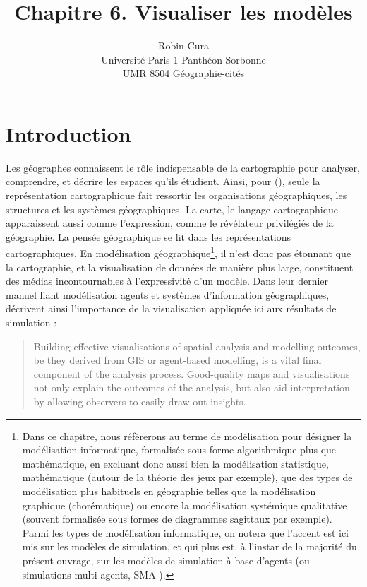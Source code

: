 \documentclass[a4paper, 12pt]{article}
\title{Chapitre 6. Visualiser les modèles}
\author{Robin Cura\\Université Paris 1 Panthéon-Sorbonne\\UMR 8504 Géographie-cités}
\date{}
\begin{document}
\maketitle

\setcounter{tocdepth}{2}

\section*{Introduction\label{sec:intro}}

Les géographes connaissent le rôle indispensable de la cartographie pour analyser, comprendre, et décrire les espaces qu'ils étudient.
Ainsi, pour  (\citeyear[\ppno~246--247]{pinchemel_geographie_1979}),
\og seule la représentation cartographique fait ressortir les organisations géographiques, les structures et les systèmes géographiques. La carte, le langage cartographique apparaissent aussi comme l'expression, comme le révélateur privilégiés de la géographie. La pensée géographique se lit dans les représentations cartographiques\fg{}.
En modélisation géographique\footnote{
Dans ce chapitre, nous référerons au terme de \og modélisation\fg{} pour désigner la modélisation informatique, formalisée sous forme algorithmique plus que mathématique, en excluant donc aussi bien la modélisation statistique, mathématique (autour de la théorie des jeux par exemple), que des types de modélisation plus habituels en géographie telles que la modélisation graphique (chorématique) ou encore la modélisation systémique qualitative (souvent formalisée sous formes de diagrammes sagittaux par exemple). Parmi les types de modélisation informatique, on notera que l'accent est ici mis sur les modèles de simulation, et qui plus est, à l'instar de la majorité du présent ouvrage, sur les modèles de simulation à base d'agents (ou simulations multi-agents, \og SMA \fg{}).
}, il n'est donc pas étonnant que la cartographie, et la visualisation de données de manière plus large, constituent des médias incontournables à l'expressivité d'un modèle.
Dans leur dernier manuel liant modélisation agents et systèmes d'information géographiques, \textcite{crooks_agent-based_2019} décrivent ainsi l'importance de la visualisation appliquée ici aux résultats de simulation :
\begin{quote}
	\og Building effective visualisations of spatial analysis and modelling outcomes, be they derived from GIS or agent-based modelling, is a vital final component of the analysis process.
	Good-quality maps and visualisations not only explain the outcomes of the analysis, but also aid interpretation by allowing observers to easily draw out insights.\fg{} \mbox{}~ \hfill \cite[117]{crooks_agent-based_2019}
\end{quote}
\end{document}
